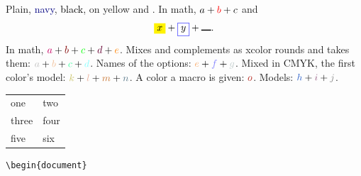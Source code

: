 \documentclass{article}
\newcommand{\warm}[1]{\textcolor{red!50!yellow}{#1}}
\newcommand{\hl}[2]{\textcolor{#1}{#2}}
\begin{document}
Plain, \textcolor{navy}{navy}, \textcolor{black}{black},
\colorbox{yellow!30}{on yellow} and .
In math, $a + \textcolor{red}{b} + {\color{black} c}$ and
\[ \colorbox{yellow}{$x$} + \fcolorbox{blue}{white}{$y$} + \rule{1em}{1pt}. \]
In math, $\textcolor{ink}{a} + \textcolor{red!50!black}{b} + \textcolor{green}{c} + \textcolor{ember}{d} + \warm{e}$.
Mixes and complements as xcolor rounds and takes them:
$\textcolor{gray!50}{a} + \textcolor{ink!50!yellow!50}{b} + \textcolor{-ink}{c} + \textcolor{-red!50!black}{d}$.
Names of the options: $\textcolor{Apricot}{e} + \textcolor{Blue!50}{f} + \textcolor{Azure3}{g}$.
Mixed in CMYK, the first color's model:
$\textcolor{olive!50}{k} + \textcolor{BrickRed!30}{l} + \textcolor{Mahogany!40!Goldenrod}{m} + \textcolor{-BrickRed!40}{n}$.
A color a macro is given: $\hl{BrickRed}{o}$.
Models: $\textcolor[HTML]{3366CC}{h} + \textcolor[cmyk]{0.2,0.5,0.1,0.3}{i} + \textcolor[Gray]{8}{j}$.

\begin{tabular}{ll}
\rowcolor{yellow!30} one & two \\
\cellcolor{ink!25} three & four \\
\rowcolor{-ink} five & \cellcolor{-ink} six \\
\end{tabular}

\begin{lstlisting}
\begin{document}
\end{lstlisting}
\end{document}
